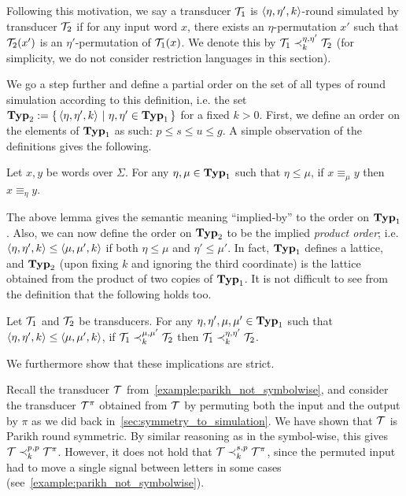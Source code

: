 Following this motivation, we say a transducer $\mathcal{T}_1$ is $\left< \eta, \eta', k\right>$-round simulated by transducer $\mathcal{T}_2$ if for any input word $x$, there exists an $\eta$-permutation $x'$ such that $\mathcal{T}_2(x')$ is an $\eta'$-permutation of $\mathcal{T}_1(x)$. We denote this by $\mathcal{T}_1 \prec_{k}^{\eta,\eta'} \mathcal{T}_2$ (for simplicity, we do not consider restriction languages in this section).

We go a step further and define a partial order on the set of all types of round simulation according to this definition, i.e. the set $\mathbf{Typ}_2:=\left\{\,\left< \eta, \eta', k\right>\ \middle|\ \eta,\eta'\in \mathbf{Typ}_1\,\right\}$ for a fixed $k>0$. First, we define an order on the elements of $\mathbf{Typ}_1$ as such: $p\leq s\leq u\leq g$. A simple observation of the definitions gives the following.

\begin{lemma}
    Let $x,y$ be words over $\Sigma$. For any $\eta,\mu\in\mathbf{Typ}_1$ such that $\eta\leq \mu$, if $x\equiv_\mu y$ then $x\equiv_\eta y$.
\end{lemma}

The above lemma gives the semantic meaning ``implied-by'' to the order on $\mathbf{Typ}_1$. Also, we can now define the order on $\mathbf{Typ}_2$ to be the implied \emph{product order}; i.e. $\left< \eta, \eta', k\right>\leq \left< \mu, \mu', k\right>$ if both $\eta\leq \mu$ and $\eta'\leq \mu'$. In fact, $\mathbf{Typ}_1$ defines a lattice, and $\mathbf{Typ}_2$ (upon fixing $k$ and ignoring the third coordinate) is the lattice obtained from the product of two copies of $\mathbf{Typ}_1$. It is not difficult to see from the definition that the following holds too.

\begin{lemma}
\label{lemma:partial_order_tups}
        Let $\mathcal{T}_1$ and $\mathcal{T}_2$ be transducers. For any $\eta,\eta',\mu,\mu'\in\mathbf{Typ}_1$ such that $\left< \eta,\eta',k\right>\leq \left< \mu,\mu',k\right>$, if $\mathcal{T}_1 \prec_{k}^{\mu,\mu'} \mathcal{T}_2$ then $\mathcal{T}_1 \prec_{k}^{\eta,\eta'} \mathcal{T}_2$.
\end{lemma}
We furthermore show that these implications are strict.

Recall the transducer $\mathcal{T}$ from~\autoref{example:parikh_not_symbolwise}, and consider the transducer $\mathcal{T}^\pi$ obtained from $\mathcal{T}$ by permuting both the input and the output by $\pi$ as we did back in~\autoref{sec:symmetry_to_simulation}. We have shown that $\mathcal{T}$ is Parikh round symmetric. By similar reasoning as in the symbol-wise, this gives $\mathcal{T}\prec^{p,p}_k \mathcal{T}^\pi$. However, it does not hold that $\mathcal{T}\prec^{s,p}_k \mathcal{T}^\pi$, since the permuted input had to move a single signal between letters in some cases (see~\autoref{example:parikh_not_symbolwise}).

